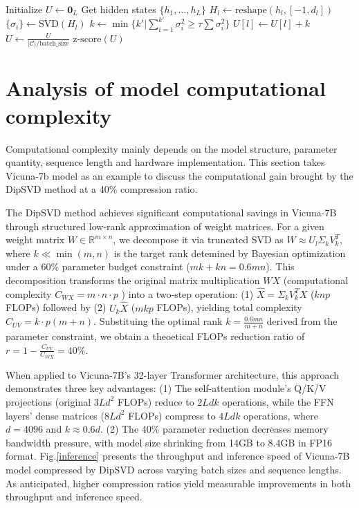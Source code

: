 \documentclass[11pt]{article}
\begin{document}
\begin{algorithm*}[ht]
\caption{Effective Rank Computation}
\begin{algorithmic}[1]
    \State Initialize $U \gets \mathbf{0}_L$
        \State Get hidden states $\{h_1,...,h_L\}$
            \State $H_l \gets \text{reshape}(h_l, [-1, d_l])$
            \State $\{\sigma_i\} \gets \text{SVD}(H_l)$
            \State $k \gets \min\{k' | \sum_{i=1}^{k'}\sigma_i^2 \geq \tau\sum\sigma_i^2\}$
            \State $U[l] \gets U[l] + k$
        \EndFor
    \EndFor
    \State $U \gets \frac{U}{|\mathcal{C}|/\text{batch\_size}}$
    \State \Return $\text{z-score}(U)$
\EndFunction
\end{algorithmic}
\label{algorithm5}
\end{algorithm*}



\section{Analysis of model computational complexity}
Computational complexity mainly depends on the model structure, parameter quantity, sequence length and hardware implementation. This section takes Vicuna-7b model as an example to discuss the computational gain brought by the DipSVD method at a 40\% compression ratio.

The DipSVD method achieves significant computational savings in Vicuna-7B through structured low-rank approximation of weight matrices. For a given weight matrix $W \in \mathbb{R}^{m\times n}$, we decompose it via truncated SVD as $W \approx U_l \Sigma_k V^T_k$, where $k \ll \min(m,n)$ is the target rank detemined by Bayesian optimization under a 60\% parameter budget constraint ($mk +kn = 0.6mn$). This decomposition transforms the original matrix multiplication $WX$ (computational complexity $C_{WX} = m\cdot n\cdot p$ ) into a two-step operation: (1) $\hat{X} = \Sigma_k V_k^T X $ ($knp$ FLOPs) followed by (2) $U_k \hat{X}$ ($mkp$ FLOPs), yielding total complexity $C_{UV} = k \cdot p(m+n)$. Substituing the optimal rank $k= \frac{0.6mn}{m+n}$ derived from the parameter constraint, we obtain a theoetical FLOPs reduction ratio of $r= 1-\frac{C_{UV}}{C_{WX}}=40\%$.

When applied to Vicuna-7B's 32-layer Transformer architecture, this approach demonstrates three key advantages: (1) The self-attention module's Q/K/V projections (original $3Ld^2$ FLOPs) reduce to $2Ldk$ operations, while the FFN layers' dense matrices ($8Ld^2$ FLOPs) compress to $4Ldk$ operations, where $d=4096$ and $k\approx 0.6d$. (2) The 40\% parameter reduction decreases memory bandwidth pressure, with model size shrinking from 14GB to 8.4GB in FP16 format. Fig.\ref{inference} presents the throughput and inference speed of Vicuna-7B model compressed by DipSVD across varying batch sizes and sequence lengths. As anticipated, higher compression ratios yield measurable improvements in both throughput and inference speed.
\end{document}
